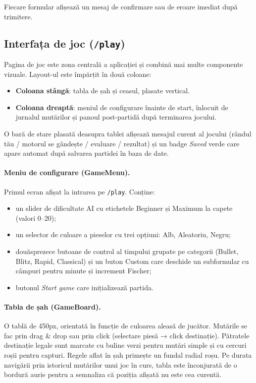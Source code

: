 \documentclass[12pt,a4paper]{article}
\begin{document}
Fiecare formular afișează un mesaj de confirmare sau de eroare imediat după trimitere.

\subsection{Interfața de joc (\texttt{/play})}

Pagina de joc este zona centrală a aplicației și combină mai multe componente vizuale. Layout-ul este împărțit în două coloane:
\begin{itemize}
  \item \textbf{Coloana stângă}: tabla de șah și ceasul, plasate vertical.
  \item \textbf{Coloana dreaptă}: meniul de configurare înainte de start, înlocuit de jurnalul mutărilor și panoul post-partidă după terminarea jocului.
\end{itemize}
O bară de stare plasată deasupra tablei afișează mesajul curent al jocului (rândul tău / motorul se gândește / evaluare / rezultat) și un badge \textit{Saved} verde care apare automat după salvarea partidei în baza de date.

\paragraph{Meniu de configurare (GameMenu).}
Primul ecran afișat la intrarea pe \texttt{/play}. Conține:
\begin{itemize}
  \item un slider de dificultate AI cu etichetele Beginner și Maximum la capete (valori 0–20);
  \item un selector de culoare a pieselor cu trei opțiuni: Alb, Aleatoriu, Negru;
  \item douăsprezece butoane de control al timpului grupate pe categorii (Bullet, Blitz, Rapid, Classical) și un buton Custom care deschide un subformular cu câmpuri pentru minute și increment Fischer;
  \item butonul \textit{Start game} care inițializează partida.
\end{itemize}

\paragraph{Tabla de șah (GameBoard).}
O tablă de 450px, orientată în funcție de culoarea aleasă de jucător. Mutările se fac prin drag \& drop sau prin click (selectare piesă → click destinație). Pătratele destinație legale sunt marcate cu buline verzi pentru mutări simple și cu cercuri roșii pentru capturi. Regele aflat în șah primește un fundal radial roșu. Pe durata navigării prin istoricul mutărilor unui joc în curs, tabla este înconjurată de o bordură aurie pentru a semnaliza că poziția afișată nu este cea curentă.
\end{document}
